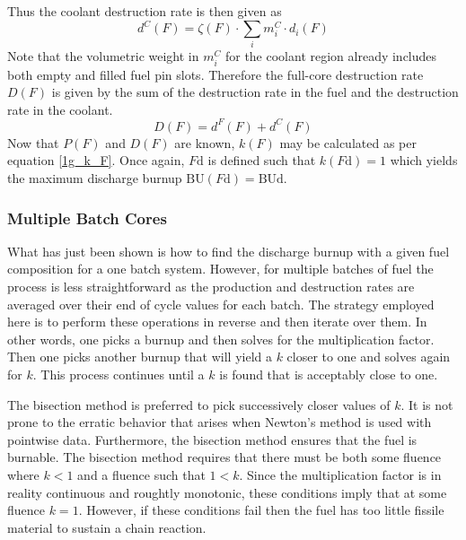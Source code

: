 Thus the coolant destruction rate is then given as
\begin{equation}
\label{1g_dC_F}
d^C(F) = \zeta(F) \cdot \sum_i m_i^C \cdot d_i(F)
\end{equation}
Note that the volumetric weight in $m_i^C$ for the coolant region already includes both 
empty and filled fuel pin slots.  Therefore the full-core destruction rate $D(F)$ is given by 
the sum of the destruction rate in the fuel and the destruction rate in the coolant.  
\begin{equation}
\label{1g_D_F}
D(F) = d^F(F) + d^C(F)
\end{equation}
Now that $P(F)$ and $D(F)$ are known, $k(F)$ may be calculated as per equation \ref{1g_k_F}.  
Once again, $F\mbox{d}$ is defined such that $k(F\mbox{d}) = 1$ which yields the maximum discharge 
burnup $\mbox{BU}(F\mbox{d}) = \mbox{BUd}$.




\subsubsection{Multiple Batch Cores}
\label{1g_sec:batch_ave}
What has just been shown is how to find the discharge burnup with a given fuel composition for a one
batch system.  However, for multiple batches of fuel the process is less straightforward as the 
production and destruction rates are averaged over their end of cycle values for each batch.  
The strategy employed here is to perform these operations in reverse and then iterate over them.  
In other words, one picks a burnup and then solves for the multiplication factor.  Then one picks 
another burnup that will yield a $k$ closer to one and solves again for $k$.  This process continues 
until a $k$ is found that is acceptably close to one.  

The bisection method is preferred to pick successively closer values of $k$.  It is not prone to the 
erratic behavior that arises when Newton's method is used with pointwise data.   Furthermore, the 
bisection method ensures that the fuel is burnable.  The bisection method requires that there must 
be both some fluence where $k < 1$ and a fluence such that $1 < k$.  Since the multiplication factor 
is in reality continuous and roughtly monotonic, these conditions imply that at some fluence $k = 1$.  
However, if these conditions fail then the fuel has too little fissile material to sustain a chain reaction. 

